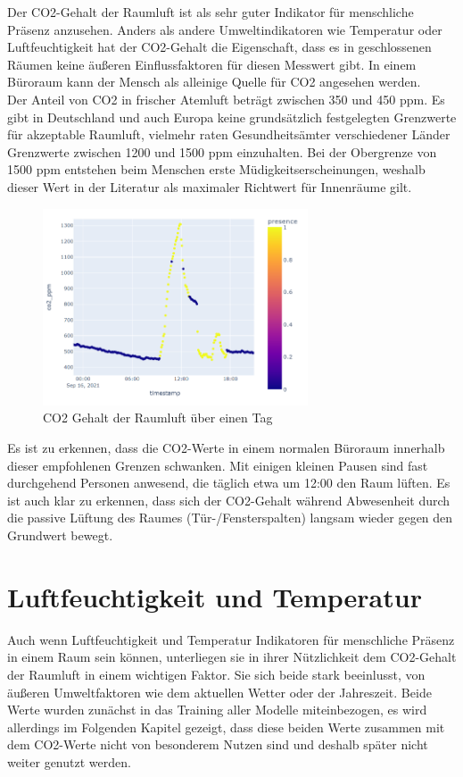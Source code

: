 Der CO2-Gehalt der Raumluft ist als sehr guter Indikator für menschliche Präsenz anzusehen. Anders als andere 
Umweltindikatoren wie Temperatur oder Luftfeuchtigkeit hat der CO2-Gehalt die Eigenschaft, dass es in 
geschlossenen Räumen keine äußeren Einflussfaktoren für diesen Messwert gibt. In einem Büroraum kann der 
Mensch als alleinige Quelle für CO2 angesehen werden.\\
Der Anteil von CO2 in frischer Atemluft beträgt zwischen 350 und 450 ppm. Es gibt in Deutschland und auch Europa 
keine grundsätzlich festgelegten Grenzwerte für akzeptable Raumluft, vielmehr raten Gesundheitsämter 
verschiedener Länder Grenzwerte zwischen 1200 und 1500 ppm einzuhalten. Bei der Obergrenze von 1500 ppm 
entstehen beim Menschen erste Müdigkeitserscheinungen, weshalb dieser Wert in der Literatur als maximaler 
Richtwert für Innenräume gilt.

\begin{figure}[h]
    \centering
    \includegraphics[width=0.7\textwidth]{pic/co2_singleDay.png}
    \caption{CO2 Gehalt der Raumluft über einen Tag}
    \label{fig:CO2_oneDay}
\end{figure}
 
Es ist zu erkennen, dass die CO2-Werte in einem normalen Büroraum innerhalb dieser empfohlenen Grenzen schwanken.
Mit einigen kleinen Pausen sind fast durchgehend Personen anwesend, die täglich etwa um 12:00 den Raum lüften.
Es ist auch klar zu erkennen, dass sich der CO2-Gehalt während Abwesenheit durch die passive Lüftung des Raumes  
(Tür-/Fensterspalten) langsam wieder gegen den Grundwert bewegt.

\section{Luftfeuchtigkeit und Temperatur}
Auch wenn Luftfeuchtigkeit und Temperatur Indikatoren für menschliche Präsenz in einem Raum sein können, 
unterliegen sie in ihrer Nützlichkeit dem CO2-Gehalt der Raumluft in einem wichtigen Faktor. 
Sie sich beide stark beeinlusst, von äußeren Umweltfaktoren wie dem aktuellen Wetter oder der Jahreszeit.
Beide Werte wurden zunächst in das Training aller Modelle miteinbezogen, es wird allerdings im Folgenden 
Kapitel gezeigt, dass diese beiden Werte zusammen mit dem CO2-Werte nicht von besonderem Nutzen sind und 
deshalb später nicht weiter genutzt werden.  

